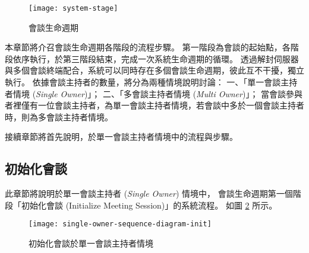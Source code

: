 \begin{figure}[H]
    \centering
    \texttt{[image: system-stage]}
    \caption{會談生命週期}\label{fig:system-stage}
\end{figure}

    本章節將介召會談生命週期各階段的流程步驟。
第一階段為會談的起始點，各階段依序執行，於第三階段結束，完成一次系統生命週期的循環。
透過解封伺服器與多個會談終端配合，系統可以同時存在多個會談生命週期，彼此互不干擾，獨立執行。
依據會談主持者的數量，將分為兩種情境說明討論：
一、「單一會談主持者情境 ({\it Single Owner})」；
二、「多會談主持者情境 ({\it Multi Owner})」；
當會談參與者裡僅有一位會談主持者，為單一會談主持者情境，若會談中多於一個會談主持者時，則為多會談主持者情境。

    接續章節將首先說明，於單一會談主持者情境中的流程與步驟。


\subsection{初始化會談}\label{subsec:initialize}

    此章節將說明於單一會談主持者 ({\it Single Owner}) 情境中，
會談生命週期第一個階段「初始化會談 (Initialize Meeting Session)」的系統流程。
如圖 \ref{fig:s-o-init} 所示。

\begin{figure}[H]
    \centering
    \texttt{[image: single-owner-sequence-diagram-init]}
    \caption{初始化會談於單一會談主持者情境}\label{fig:s-o-init}
\end{figure}


